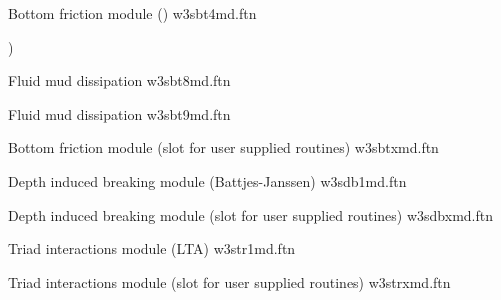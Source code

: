 \noindent
Bottom friction module (\showex) \hfill {\file w3sbt4md.ftn}

\begin{flisti}
)
\end{flisti}

\noindent
Fluid mud dissipation \citep{art:DL78}  \hfill {\file w3sbt8md.ftn}

\begin{flisti}
\end{flisti}

\pb \noindent
Fluid mud dissipation \citep{art:Ng00}  \hfill {\file w3sbt9md.ftn}

\begin{flisti}
\end{flisti}

\noindent
Bottom friction module (slot for user supplied routines) \hfill {\file
w3sbtxmd.ftn}

\begin{flisti}
\end{flisti}

\noindent
Depth induced breaking module (Battjes-Janssen) \hfill {\file w3sdb1md.ftn}

\begin{flisti}
\end{flisti}

\noindent
Depth induced breaking module (slot for user supplied routines) \hfill {\file
w3sdbxmd.ftn}

\begin{flisti}
\end{flisti}

\noindent
Triad interactions module (LTA) \hfill {\file w3str1md.ftn}

\begin{flisti}
\end{flisti}

\noindent
Triad interactions module (slot for user supplied routines) \hfill {\file
w3strxmd.ftn}

\begin{flisti}
\end{flisti}


